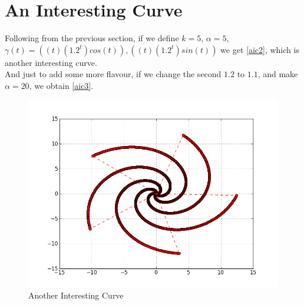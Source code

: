\section{An Interesting Curve}
	Following from the previous section, if we define $k=5$, $\alpha=5$, $\gamma(t)=((t)(1.2^t)cos(t)),((t)(1.2^t)sin(t))$ we get \autoref{aic2}, which is another interesting curve.
	\\
	And just to add some more flavour, if we change the second $1.2$ to $1.1$, and make $\alpha=20$, we obtain \autoref{aic3}.\\	


	\begin{figure}[bth]
		\begin{center}
			\includegraphics[width=0.9\linewidth]{img/spiral_lessdense_clone.png}
		\end{center}
	\caption[Another Interesting Curve]{Another Interesting Curve}
	\label{aic2}
	\end{figure}

